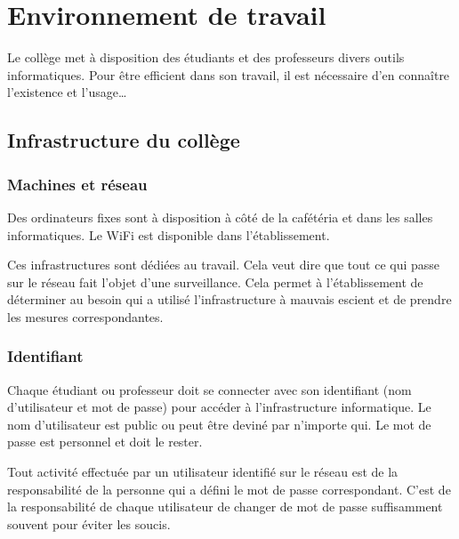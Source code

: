 \documentclass[10pt,a4paper]{report}
\begin{document}
\chapterFormat




\chapter*{Environnement de travail}

Le collège met à disposition des étudiants et des professeurs divers outils informatiques. Pour être efficient dans son travail, il est nécessaire d'en connaître l'existence et l'usage\dots





\section{Infrastructure du collège}



\subsection{Machines et réseau}

Des ordinateurs fixes sont à disposition à côté de la cafétéria et dans les salles informatiques. Le WiFi est disponible dans l'établissement.

Ces infrastructures sont dédiées au travail. Cela veut dire que tout ce qui passe sur le réseau fait l'objet d'une surveillance. Cela permet à l'établissement de déterminer au besoin qui a utilisé l'infrastructure à mauvais escient et de prendre les mesures correspondantes.



\subsection{Identifiant}

Chaque étudiant ou professeur doit se connecter avec son identifiant (nom d'utilisateur et mot de passe) pour accéder à l'infrastructure informatique. Le nom d'utilisateur est public ou peut être deviné par n'importe qui. Le mot de passe est personnel et doit le rester.

\attention Tout activité effectuée par un utilisateur identifié sur le réseau est de la responsabilité de la personne qui a défini le mot de passe correspondant. C'est de la responsabilité de chaque utilisateur de changer de mot de passe suffisamment souvent pour éviter les soucis.
\end{document}
